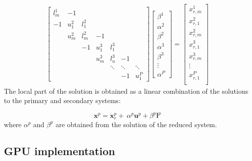 \documentclass{elsarticle}
\begin{document}
\begin{align} \label{eqn:reduced-system}
&
\begin{bmatrix}
l^1_m & -1 \\
-1    & u^2_1 & l^2_1 \\
      & u^2_m & l^2_m & -1 \\
      &       & -1    & u^3_1 & l^3_1 \\
      &       &       & u^3_m & l^3_n  & -1 \\
      &       &       &       & \ddots & \ddots & \ddots \\
      &       &       &       &        & -1     & u^P_1
\end{bmatrix}
\begin{bmatrix}
\beta^1 \\
\alpha^2 \\
\beta^2 \\
\alpha^3 \\
\beta^3 \\
\vdots \\
\alpha^P
\end{bmatrix}
=
\begin{bmatrix}
x_{r,m}^1 \\
x_{r,1}^2 \\
x_{r,m}^2 \\
x_{r,1}^3 \\
x_{r,m}^3 \\
\vdots \\
x_{r,1}^P \\
\end{bmatrix}
&
\end{align}
The local part of the solution
is obtained as a linear combination of
the solutions to the primary and secondary systems:

\begin{equation}
    \bm{x}^p = \bm{x}_r^p + \
        \alpha^p \bm{u}^p + \beta^p \bm{l}^p
    \label{eqn:sum-of-systems}
\end{equation}
%
where $\alpha^p$ and $\beta^p$ are obtained
from the solution of the reduced system.

\subsection{GPU implementation}
\end{document}
